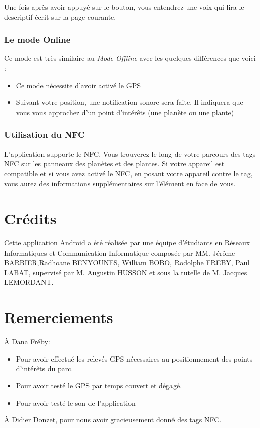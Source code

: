 \documentclass[a4paper,11pt]{article}
\begin{document}
    Une fois après avoir appuyé sur le bouton, vous entendrez une voix qui lira le descriptif écrit sur la page courante.
    
   \subsubsection{Le mode Online}
   Ce mode est très similaire au \textit{Mode Offline} avec les quelques différences que voici : 
   \begin{itemize}
    \item Ce mode nécessite d'avoir activé le GPS 
    \item Suivant votre position, une notification sonore sera faite. Il indiquera que vous vous approchez d'un point d'intérêts (une planète ou une plante)
   \end{itemize}

   \subsubsection*{Utilisation du NFC}
    L'application supporte le NFC. Vous trouverez le long de votre parcours des tags NFC sur les panneaux des planètes et des plantes.
      Si votre appareil est compatible et si vous avez activé le NFC, en posant votre appareil contre le tag, 
      vous aurez des informations supplémentaires sur l'élément en face de vous.

   
    \section{Crédits}
    Cette application Android a été réalisée par une équipe d'étudiants en Réseaux Informatiques et Communication Informatique composée par 
    MM. Jérôme BARBIER,Radhoane BENYOUNES, William BOBO, Rodolphe FREBY, Paul LABAT, supervisé par M. Augustin HUSSON et sous la tutelle 
    de M. Jacques LEMORDANT.
    
    \section{Remerciements}
    À Dana Fréby:
    \begin{itemize}
     \item Pour avoir effectué les relevés GPS nécessaires au positionnement des points d'intérêts du parc.
     \item Pour avoir testé le GPS par temps couvert et dégagé. 
     \item Pour avoir testé le son de l'application
    \end{itemize}
    
  À Didier Donzet, pour nous avoir gracieusement donné des tags NFC.
\end{document}
